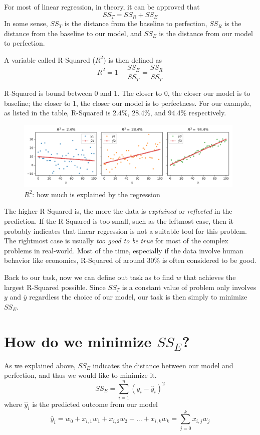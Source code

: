 \documentclass[
	letterpaper
]{article}
\begin{document}
For most of linear regression, in theory, it can be approved that 
\begin{equation}
SS_T = SS_R + SS_E
\end{equation}
In some sense, $SS_T$ is the distance from the baseline to perfection, $SS_R$ is the distance from the baseline to our model, and $SS_E$ is the distance from our model to perfection.

A variable called R-Squared ($R^2$) is then defined as 
\begin{equation}
R^2 = 1 - \frac{SS_E}{SS_T} = \frac{SS_R}{SS_T}
\end{equation}

R-Squared is bound between 0 and 1. The closer to 0, the closer our model is to baseline; the closer to 1, the closer our model is to perfectness.
For our example, as listed in the table, R-Squared is 2.4\%, 28.4\%, and 94.4\% respectively.
\begin{figure}[htbp]
	\centering
	\includegraphics[width=0.98\textwidth]{figures/comparison-rsquared.png}
	\caption{$R^2$: how much is explained by the regression}
	\label{fig:rsquared}
\end{figure}

The higher R-Squared is, the more the data is \textit{explained} or \textit{reflected} in the prediction.
If the R-Squared is too small, such as the leftmost case, then it probably indicates that linear regression is not a suitable tool for this problem.
The rightmost case is usually \textit{too good to be true} for most of the complex problems in real-world.
Most of the time, especially if the data involve human behavior like economics, R-Squared of around 30\% is often considered to be good. 

Back to our task, now we can define out task as to find $w$ that achieves the largest R-Squared possible.
Since $SS_T$ is a constant value of problem only involves $y$ and $\bar y$ regardless the choice of our model, our task is then simply to minimize $SS_E$.

\section{How do we minimize $SS_E$?}
As we explained above, $SS_E$ indicates the distance between our model and perfection, and thus we would like to minimize it.
\begin{equation}
SS_E = \sum_{i = 1}^n (y_i - \hat y_i) ^2
\end{equation}
where $\hat y_i$ is the predicted outcome from our model
\begin{equation}
\hat y_i = w_0 + x_{i, 1}w_1 + x_{i, 2}w_2 + ... + x_{i, k}w_k = \sum_{j=0} ^k x_{i, j}w_j
\end{equation}
\end{document}
